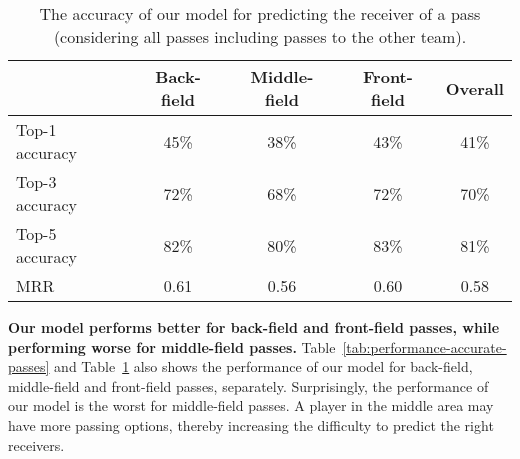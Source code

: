 \begin{table}[!t]
\caption{The accuracy of our model for predicting the receiver of a pass (considering all passes including passes to the other team).}
\centering
\begin{tabular}{lcccc}
  \hline
  & Back-field & Middle-field & Front-field & Overall \\
  \hline
  Top-1 accuracy & 45\% & 38\% & 43\% & 41\% \\
  Top-3 accuracy & 72\% & 68\% & 72\% & 70\% \\
  Top-5 accuracy & 82\% & 80\% & 83\% & 81\% \\
  MRR & 0.61 & 0.56 & 0.60 & 0.58 \\
  \hline
\end{tabular}
\label{tab:performance-all-passes}
\end{table}

\textbf{Our model performs better for back-field and front-field passes, while performing worse for middle-field passes.}
Table~\ref{tab:performance-accurate-passes} and Table~\ref{tab:performance-all-passes} also shows the performance of our model for back-field, middle-field and front-field passes, separately.
Surprisingly, the performance of our model is the worst for middle-field passes. A player in the middle area may have more passing options, thereby increasing the difficulty to predict the right receivers.

